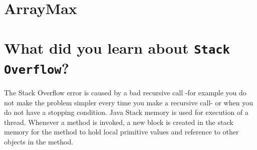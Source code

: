 \documentclass[a4paper,12pt]{article}
\begin{document}
    \section{ArrayMax}
    



    \section{What did you learn about \texttt{Stack Overflow}?}
      The Stack Overflow error is caused by a bad recursive call -for example you do not make
      the problem simpler every time you make a recursive call- or when you do not have a stopping
      condition.\cite{StackOverflow} Java Stack memory is used for execution of a thread.
      Whenever a method is invoked, a new block is created in the stack memory for the method to hold
      local primitive values and reference to other objects in the method.\cite{HeapStack}


    \newpage
    
    
\end{document}
